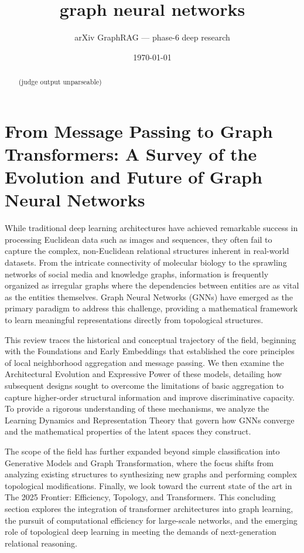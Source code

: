 \documentclass[11pt]{article}
\title{graph neural networks}
\author{arXiv GraphRAG --- phase-6 deep research}
\date{\today}
\begin{document}
\maketitle

\begin{abstract}
(judge output unparseable)
\end{abstract}

\section{From Message Passing to Graph Transformers: A Survey of the Evolution and Future of Graph Neural Networks}

While traditional deep learning architectures have achieved remarkable success in processing Euclidean data such as images and sequences, they often fail to capture the complex, non-Euclidean relational structures inherent in real-world datasets. From the intricate connectivity of molecular biology to the sprawling networks of social media and knowledge graphs, information is frequently organized as irregular graphs where the dependencies between entities are as vital as the entities themselves. Graph Neural Networks (GNNs) have emerged as the primary paradigm to address this challenge, providing a mathematical framework to learn meaningful representations directly from topological structures.

This review traces the historical and conceptual trajectory of the field, beginning with the Foundations and Early Embeddings that established the core principles of local neighborhood aggregation and message passing. We then examine the Architectural Evolution and Expressive Power of these models, detailing how subsequent designs sought to overcome the limitations of basic aggregation to capture higher-order structural information and improve discriminative capacity. To provide a rigorous understanding of these mechanisms, we analyze the Learning Dynamics and Representation Theory that govern how GNNs converge and the mathematical properties of the latent spaces they construct.

The scope of the field has further expanded beyond simple classification into Generative Models and Graph Transformation, where the focus shifts from analyzing existing structures to synthesizing new graphs and performing complex topological modifications. Finally, we look toward the current state of the art in The 2025 Frontier: Efficiency, Topology, and Transformers. This concluding section explores the integration of transformer architectures into graph learning, the pursuit of computational efficiency for large-scale networks, and the emerging role of topological deep learning in meeting the demands of next-generation relational reasoning.
\end{document}

